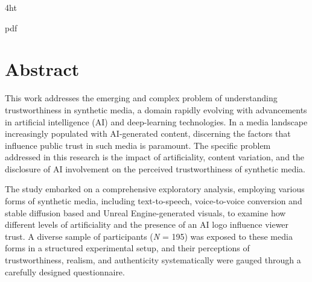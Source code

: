 \documentclass[
  a4paper,  %
  twoside,  %
  bibliography=totoc,
  headsepline,
  cleardoublepage=empty,
  parskip=half,
  draft=false
]{scrbook}
\begin{document}
\frontmatter
{} %
\setcounter{tocdepth}{2} %



\iftex4ht
  \Configure{$}{\PicMath}{\EndPicMath}{}

  {pdf}
  {%
  }
\fi



\Coverpage
\Copyright
\pagestyle{preamble}
\renewcommand*{\chapterpagestyle}{preamble}




\section*{Abstract}

This work addresses the emerging and complex problem of understanding trustworthiness in synthetic media, a domain rapidly evolving with advancements in artificial intelligence (AI) and deep-learning technologies. In a media landscape increasingly populated with AI-generated content, discerning the factors that influence public trust in such media is paramount. The specific problem addressed in this research is the impact of artificiality, content variation, and the disclosure of AI involvement on the perceived trustworthiness of synthetic media.

The study embarked on a comprehensive exploratory analysis, employing various forms of synthetic media, including text-to-speech, voice-to-voice conversion and stable diffusion based and Unreal Engine-generated visuals, to examine how different levels of artificiality and the presence of an AI logo influence viewer trust. A diverse sample of participants (\textit{N} = 195) was exposed to these media forms in a structured experimental setup, and their perceptions of trustworthiness, realism, and authenticity systematically were gauged through a carefully designed questionnaire.
\end{document}
